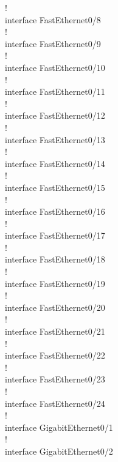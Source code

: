 \documentclass[a4paper,14pt]{extarticle}
\begin{document}
\begin{singlespace}
\begin{tcolorbox}[breakable]
            !\\
            interface FastEthernet0/8\\
            !\\
            interface FastEthernet0/9\\
            !\\
            interface FastEthernet0/10\\
            !\\
            interface FastEthernet0/11\\
            !\\
            interface FastEthernet0/12\\
            !\\
            interface FastEthernet0/13\\
            !\\
            interface FastEthernet0/14\\
            !\\
            interface FastEthernet0/15\\
            !\\
            interface FastEthernet0/16\\
            !\\
            interface FastEthernet0/17\\
            !\\
            interface FastEthernet0/18\\
            !\\
            interface FastEthernet0/19\\
            !\\
            interface FastEthernet0/20\\
            !\\
            interface FastEthernet0/21\\
            !\\
            interface FastEthernet0/22\\
            !\\
            interface FastEthernet0/23\\
            !\\
            interface FastEthernet0/24\\
            !\\
            interface GigabitEthernet0/1\\
            !\\
            interface GigabitEthernet0/2\\

\end{tcolorbox}
\end{singlespace}
\end{document}
